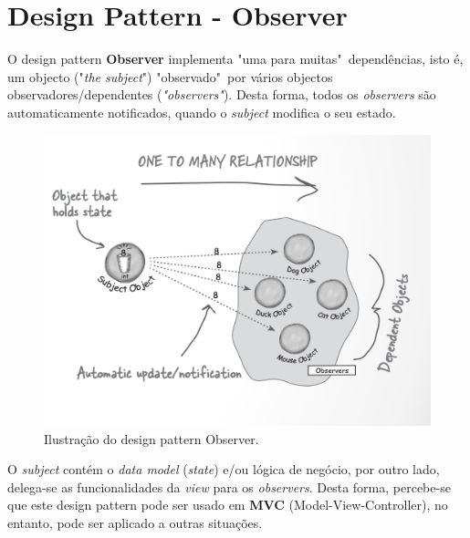 \section{Design Pattern - Observer}
\label{sec:observer}

\hspace{5mm} O design pattern \textbf{Observer} implementa "uma para muitas"\ dependências, isto é, um objecto ("\textit{the subject}") "observado"\ por vários objectos observadores/dependentes (\textit{"observers"}). Desta forma, todos os \textit{observers} são automaticamente notificados, quando o \textit{subject} modifica o seu estado.

\begin{figure}[H]
    \centering
    \includegraphics[scale=0.55]{images/observer-1.png}
    \caption{Ilustração do design pattern Observer.}
    \label{fig:mod_dom}
\end{figure}

\hspace{2mm} O \textit{subject} contém o \textit{data model} (\textit{state}) e/ou lógica de negócio, por outro lado, delega-se as funcionalidades da \textit{view} para os \textit{observers}. Desta forma, percebe-se que este design pattern pode ser usado em \textbf{MVC} (Model-View-Controller), no entanto, pode ser aplicado a outras situações.



